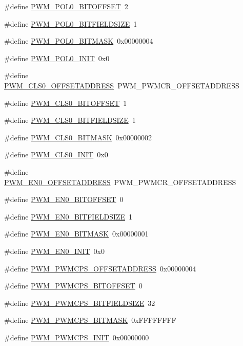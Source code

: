 \begin{DoxyCompactItemize}
\#define \hyperlink{a00565_a9d39b8850cc9ac2c4fa32e9cc1bce5f9}{PWM\_\-POL0\_\-BITOFFSET}~2
\item 
\#define \hyperlink{a00565_a0976f8f4717ee2f374fd23ee64cb60d5}{PWM\_\-POL0\_\-BITFIELDSIZE}~1
\item 
\#define \hyperlink{a00565_a169e4ad3a000055444ecf5f5a0a3d99c}{PWM\_\-POL0\_\-BITMASK}~0x00000004
\item 
\#define \hyperlink{a00565_ac58d25159b2b429b71bb96545f3b3673}{PWM\_\-POL0\_\-INIT}~0x0
\item 
\#define \hyperlink{a00565_a0c550f5d2d70f5e6d68ab9a0ea7cc3c2}{PWM\_\-CLS0\_\-OFFSETADDRESS}~PWM\_\-PWMCR\_\-OFFSETADDRESS
\item 
\#define \hyperlink{a00565_a794c36116a3f31f40f7cdae0b58b6a3c}{PWM\_\-CLS0\_\-BITOFFSET}~1
\item 
\#define \hyperlink{a00565_ac6a9bd678846a70c3f515ca6ccbc15d3}{PWM\_\-CLS0\_\-BITFIELDSIZE}~1
\item 
\#define \hyperlink{a00565_a2a9e82a21817093eb5177a6f4a306962}{PWM\_\-CLS0\_\-BITMASK}~0x00000002
\item 
\#define \hyperlink{a00565_a5976b8924a69c971d37e8b23bdca325f}{PWM\_\-CLS0\_\-INIT}~0x0
\item 
\#define \hyperlink{a00565_ade5fe532100cb8c66b4abc1f7895aff8}{PWM\_\-EN0\_\-OFFSETADDRESS}~PWM\_\-PWMCR\_\-OFFSETADDRESS
\item 
\#define \hyperlink{a00565_a1a35a931958ece14629a7abd0c028a56}{PWM\_\-EN0\_\-BITOFFSET}~0
\item 
\#define \hyperlink{a00565_a63df657a3c34278532572df2feed73b0}{PWM\_\-EN0\_\-BITFIELDSIZE}~1
\item 
\#define \hyperlink{a00565_a1c78dc20905ee75158c8502e81d5bfb8}{PWM\_\-EN0\_\-BITMASK}~0x00000001
\item 
\#define \hyperlink{a00565_a710b5a6b2483dfbf8251fbf642be4b2e}{PWM\_\-EN0\_\-INIT}~0x0
\item 
\#define \hyperlink{a00565_ae6722fb70732f8b8a2b53ce99e78a8b9}{PWM\_\-PWMCPS\_\-OFFSETADDRESS}~0x00000004
\item 
\#define \hyperlink{a00565_a6bede042f00b760aa67e03e55dab81c6}{PWM\_\-PWMCPS\_\-BITOFFSET}~0
\item 
\#define \hyperlink{a00565_aa4d129d4f2a6e8b93d85571952232483}{PWM\_\-PWMCPS\_\-BITFIELDSIZE}~32
\item 
\#define \hyperlink{a00565_a46fc28857838e93b502ee449c130598c}{PWM\_\-PWMCPS\_\-BITMASK}~0xFFFFFFFF
\item 
\#define \hyperlink{a00565_a8f654e6b58b75107e15f80a12ec97476}{PWM\_\-PWMCPS\_\-INIT}~0x00000000

\end{DoxyCompactItemize}
